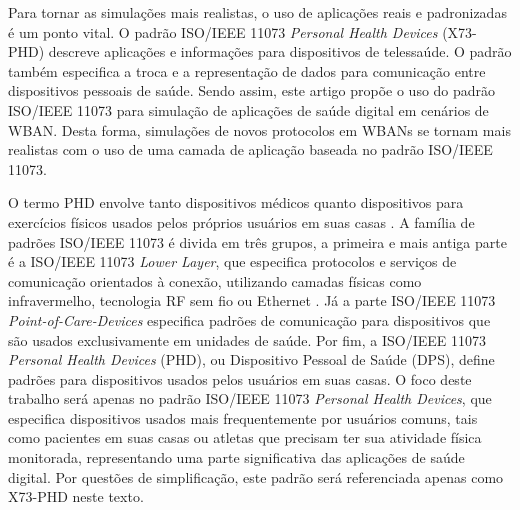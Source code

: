 Para tornar as simulações mais realistas, o uso de aplicações reais e padronizadas é um ponto vital. O padrão ISO/IEEE 11073 \textit{Personal Health Devices} (X73-PHD) descreve aplicações e informações para dispositivos de telessaúde. O padrão também especifica a troca e a representação de dados para comunicação entre dispositivos pessoais de saúde. Sendo assim, este artigo propõe o uso do padrão ISO/IEEE 11073 para simulação de aplicações de saúde digital em cenários de WBAN. Desta forma, simulações de novos protocolos em WBANs se tornam mais realistas com o uso de uma camada de aplicação baseada no padrão ISO/IEEE 11073.

O termo PHD envolve tanto dispositivos médicos quanto dispositivos para exercícios físicos usados pelos próprios usuários em suas casas \cite{b3}. A família de padrões ISO/IEEE 11073 é divida em três grupos, a primeira e mais antiga parte é a ISO/IEEE 11073 \textit{Lower Layer}, que especifica protocolos e serviços de comunicação orientados à conexão, utilizando camadas físicas como infravermelho, tecnologia RF sem fio ou Ethernet \cite{b16}. Já a parte ISO/IEEE 11073 \textit{Point-of-Care-Devices} especifica padrões de comunicação para dispositivos que são usados exclusivamente em unidades de saúde. Por fim, a ISO/IEEE 11073 \textit{Personal Health Devices} (PHD), ou Dispositivo Pessoal de Saúde (DPS), define padrões para dispositivos usados pelos usuários em suas casas. O foco deste trabalho será apenas no padrão ISO/IEEE 11073 \textit{Personal Health Devices}, que especifica dispositivos usados mais frequentemente por usuários comuns, tais como pacientes em suas casas ou atletas que precisam ter sua atividade física monitorada, representando uma parte significativa das aplicações de saúde digital. Por questões de simplificação, este padrão será referenciada apenas como X73-PHD neste texto.

